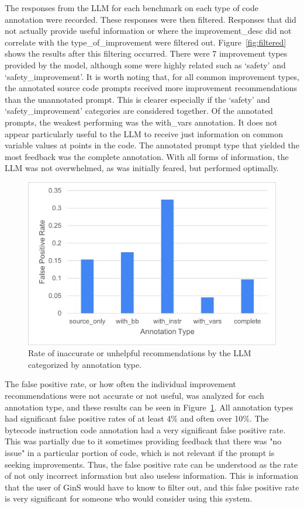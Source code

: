 \documentclass[sigconf]{acmart}
\begin{document}
The responses from the LLM for each benchmark on each type of code annotation were recorded.
These responses were then filtered.
Responses that did not actually provide useful information or where the improvement\_desc did not correlate with the type\_of\_improvement were filtered out.
Figure~\ref{fig:filtered} shows the results after this filtering occurred.
There were 7 improvement types provided by the model, although some were highly related such as `safety' and `safety\_improvement'.
It is worth noting that, for all common improvement types, the annotated source code prompts received more improvement recommendations than the unannotated prompt.
This is clearer especially if the `safety' and `safety\_improvement' categories are considered together.
Of the annotated prompts, the weakest performing was the with\_vars annotation.
It does not appear particularly useful to the LLM to receive just information on common variable values at points in the code.
The annotated prompt type that yielded the most feedback was the complete annotation.
With all forms of information, the LLM was not overwhelmed, as was initially feared, but performed optimally.

\begin{figure}
    \centering
    \includegraphics[width=0.8\linewidth]{images/FalsePositiveRate.png}
    \caption{Rate of inaccurate or unhelpful recommendations by the LLM categorized by annotation type.}
    \label{fig:falsePositive}
\end{figure}

The false positive rate, or how often the individual improvement recommendations were not accurate or not useful, was analyzed for each annotation type, and these results can be seen in Figure~\ref{fig:falsePositive}.
All annotation types had significant false positive rates of at least 4\% and often over 10\%.
The bytecode instruction code annotation had a very significant false positive rate.
This was partially due to it sometimes providing feedback that there was "no issue" in a particular portion of code, which is not relevant if the prompt is seeking improvements.
Thus, the false positive rate can be understood as the rate of not only incorrect information but also useless information.
This is information that the user of GinS would have to know to filter out, and this false positive rate is very significant for someone who would consider using this system.
\end{document}
